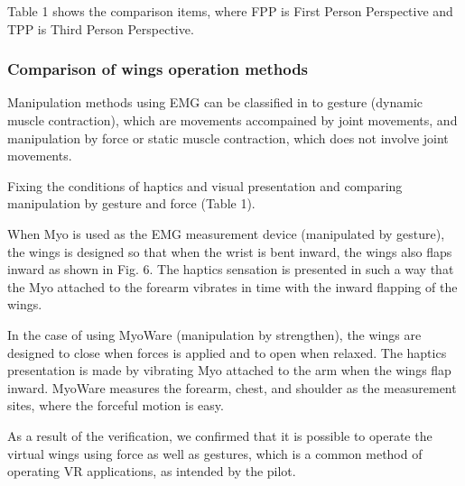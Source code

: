 \documentclass[letterpaper, 10 pt, conference]{ieeeconf}  %
\begin{document}
                Table 1 shows the comparison items, where FPP is First Person Perspective and TPP is Third Person Perspective.  

                \subsubsection{Comparison of wings operation methods}
                        Manipulation methods using EMG can be classified in to gesture (dynamic muscle contraction\cite{thistle1967isokinetic}), which are movements accompained by joint movements, and manipulation by force or static muscle contraction, which does not involve joint movements.  
                        
                        Fixing the conditions of haptics and visual presentation and comparing manipulation by gesture and force (Table 1).

                
                        When Myo is used as the EMG measurement device (manipulated by gesture), the wings is designed so that when the wrist is bent inward, the wings also flaps inward
                        as shown in Fig. 6.  
                        The haptics sensation is presented in such a way that the Myo attached to the forearm vibrates in time with the inward flapping of the wings.  

                        In the case of using MyoWare (manipulation by strengthen), the wings are designed to close when forces is applied and to open when relaxed.    
                        The haptics presentation is made by vibrating Myo attached to the arm when the wings flap inward.  
                        MyoWare measures the forearm, chest, and shoulder as the measurement sites, where the forceful motion is easy.  

                        As a result of the verification, we confirmed that it is possible to operate the virtual wings using force as well as gestures, which is a common method of operating VR applications, as intended by the pilot.  
\end{document}
